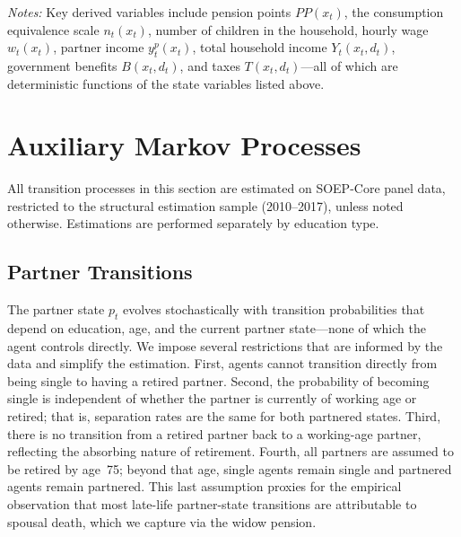 \begin{table}[htbp]
\vspace{0.5em}
\begin{minipage}{\linewidth}
\footnotesize\textit{Notes:}
Key derived variables include pension points $PP(x_t)$, the consumption
equivalence scale $n_t(x_t)$, number of children in the household,
hourly wage $w_t(x_t)$, partner income $y^p_t(x_t)$, total household
income $Y_t(x_t, d_t)$, government benefits $B(x_t, d_t)$, and taxes
$T(x_t, d_t)$---all of which are deterministic functions of the state
variables listed above.
\end{minipage}
\end{table}


\section{Auxiliary Markov Processes}
\label{sec:auxiliary_markov}

All transition processes in this section are estimated on SOEP-Core panel
data, restricted to the structural estimation sample (2010--2017), unless
noted otherwise.  Estimations are performed separately by education type.


\subsection{Partner Transitions}
\label{sec:partner_transitions}

The partner state $p_t$ evolves stochastically with transition probabilities
that depend on education, age, and the current partner state---none of which
the agent controls directly.  We impose several restrictions that are
informed by the data and simplify the estimation.  First, agents cannot
transition directly from being single to having a retired partner.  Second,
the probability of becoming single is independent of whether the partner is
currently of working age or retired; that is, separation rates are the same
for both partnered states.  Third, there is no transition from a retired
partner back to a working-age partner, reflecting the absorbing nature of
retirement.  Fourth, all partners are assumed to be retired by age~75;
beyond that age, single agents remain single and partnered agents remain
partnered.  This last assumption proxies for the empirical observation that
most late-life partner-state transitions are attributable to spousal death,
which we capture via the widow pension.

